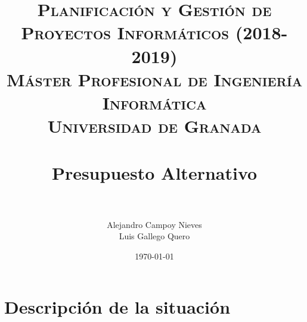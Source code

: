 

\title{	
	\normalfont \normalsize 
	\textsc{\textbf{Planificación y Gestión de Proyectos Informáticos (2018-2019)} \\ Máster Profesional de Ingeniería Informática \\ Universidad de Granada} \\ [25pt] %
	\horrule{0.5pt} \\[0.4cm] %
	\huge Presupuesto Alternativo \\ %
	\horrule{2pt} \\[0.5cm] %
}

\author{Alejandro Campoy Nieves \\ Luis Gallego Quero} %
\date{\normalsize\today} %

\usepackage[spanish, es-tabla]{babel}
\usepackage{hyperref} %
\hypersetup{
	colorlinks=true,
	linkcolor=blue,
	filecolor=magenta,      
	urlcolor=cyan,
}
\usepackage{graphicx}
\usepackage{amssymb, amsmath, amsbsy}
\usepackage{mathptmx}	
\usepackage{float}
\usepackage{booktabs}					%
\usepackage{eurosym}
\usepackage{xcolor}
\usepackage{colortbl}




	\maketitle %
	
	\newpage %
	
	\tableofcontents %
	
	
	\listoftables	
	
	\newpage	
 
\section{Descripción de la situación}

